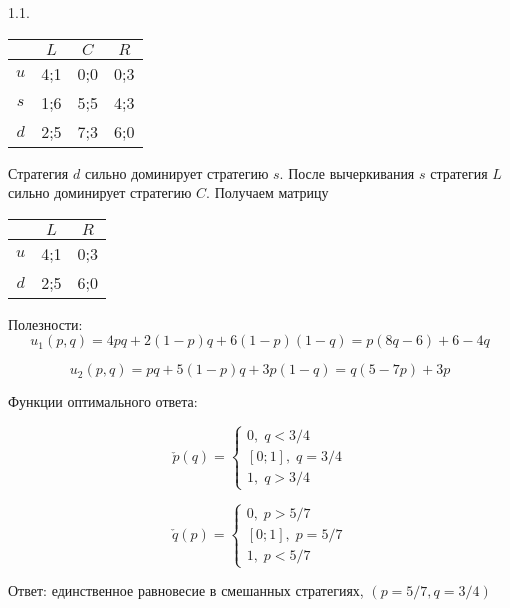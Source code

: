 \documentclass[pdftex,12pt,a4paper]{article}
\begin{document}
1.1.

\begin{tabular}{c|ccc}
 & $L$ & $C$ & $R$ \\
\midrule
$u$ & 4;1 & 0;0 & 0;3 \\
$s$ & 1;6 & 5;5 & 4;3 \\
$d$ & 2;5 & 7;3 & 6;0
\end{tabular}

Стратегия $d$ сильно доминирует стратегию $s$. После вычеркивания $s$ стратегия $L$ сильно доминирует стратегию $C$. Получаем матрицу

\begin{tabular}{c|cc}
 & $L$ & $R$ \\
\midrule
$u$ & 4;1 & 0;3 \\
$d$ & 2;5 & 6;0
\end{tabular}

Полезности:
\[
u_1(p,q) = 4pq + 2(1-p)q + 6(1-p)(1-q) = p(8q - 6) + 6 - 4q
\]

\[
u_2(p,q) = pq + 5(1-p)q + 3p(1-q) = q(5-7p)+3p
\]

Функции оптимального ответа:

\[
\check{p}(q) =
\begin{cases}
0, \; q < 3/4 \\
[0;1], \; q = 3/4 \\
1, \; q > 3/4
\end{cases}
\]

\[
\check{q}(p) =
\begin{cases}
0, \; p > 5/7 \\
[0;1], \; p = 5/7 \\
1, \; p < 5/7
\end{cases}
\]

Ответ: единственное равновесие в смешанных стратегиях, $(p=5/7, q = 3/4)$
\end{document}
